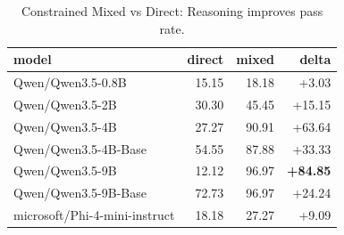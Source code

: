 \begin{table}[htbp]
  \centering
  \caption{Constrained Mixed vs Direct: Reasoning improves pass rate.}
  \label{tab:mixed_vs_direct}
  \begin{tabular}{lrrr}
    \toprule
    model & direct & mixed & delta \\
    \midrule
    Qwen/Qwen3.5-0.8B & 15.15 & 18.18 & +3.03 \\
    Qwen/Qwen3.5-2B & 30.30 & 45.45 & +15.15 \\
    Qwen/Qwen3.5-4B & 27.27 & 90.91 & +63.64 \\
    Qwen/Qwen3.5-4B-Base & 54.55 & 87.88 & +33.33 \\
    Qwen/Qwen3.5-9B & 12.12 & 96.97 & \textbf{+84.85} \\
    Qwen/Qwen3.5-9B-Base & 72.73 & 96.97 & +24.24 \\
    microsoft/Phi-4-mini-instruct & 18.18 & 27.27 & +9.09 \\
    \bottomrule
  \end{tabular}
\end{table}